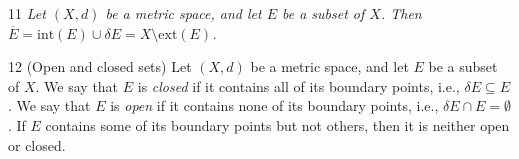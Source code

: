 \begin{corollary}{11}
    \label{closure-decomposition}
    \emph{Let $(X, d)$ be a metric space, and let $E$ be a subset of $X$. Then
    $\overline{E} = \text{int}(E) \cup \delta E = X \setminus \text{ext}(E)$.}
\end{corollary}

\begin{definition}{12}
    \label{open-closed-sets}
    (Open and closed sets) Let $(X, d)$ be a metric space, and let $E$ be a subset
    of $X$. We say that $E$ is \emph{closed} if it contains all of its boundary
    points, i.e., $\delta E \subseteq E$. We say that $E$ is \emph{open} if it
    contains none of its boundary points, i.e., $\delta E \cap E = \emptyset$. If
    $E$ contains some of its boundary points but not others, then it is neither open
    or closed.
\end{definition}

